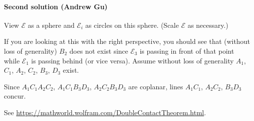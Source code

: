 \paragraph{Second solution (Andrew Gu)} View $\mathcal E$ as a sphere and $\mathcal E_i$ as circles on this sphere. (Scale $\mathcal E$ as necessary.)

If you are looking at this with the right perspective, you should see that (without loss of generality) $B_2$ does not exist since $\mathcal E_3$ is passing in front of that point while $\mathcal E_1$ is passing behind (or vice versa). Assume without loss of generality $A_1$, $C_1$, $A_2$, $C_2$, $B_3$, $D_3$ exist.

Since $A_1C_1A_2C_2$, $A_1C_1B_3D_3$, $A_2C_2B_3D_3$ are coplanar, lines $A_1C_1$, $A_2C_2$, $B_3D_3$ concur.
\begin{remark}
    See \url{https://mathworld.wolfram.com/DoubleContactTheorem.html}.
\end{remark}
